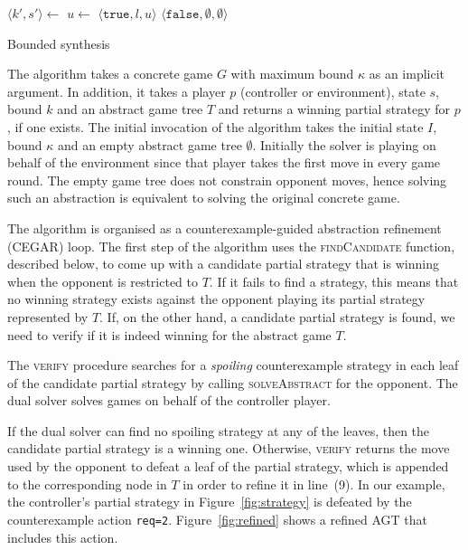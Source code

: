 \documentclass{llncs}
\newcommand{\True}{\texttt{true}}
\newcommand{\False}{\texttt{false}}
\begin{document}
\begin{algorithm}[t]
    \begin{algorithmic}
            \State $\langle k', s'\rangle \gets $  
                \State $u \gets $  
                 \Return $\langle \True, l, u \rangle$ \EndIIf {}
            \EndFor
            \State \Return $\langle \False, \emptyset, \emptyset \rangle$
        \EndFunction
    \end{algorithmic}

    \caption{Bounded synthesis}
    \label{alg:bounded}
\end{algorithm}

The algorithm takes a concrete game $G$ with maximum bound $\kappa$ as an implicit
argument.  In addition, it takes a player $p$ (controller or environment),
state $s$, bound $k$ and an abstract game tree $T$ and returns a winning
partial strategy for $p$, if one exists.  The initial invocation of the
algorithm takes the initial state $I$, bound $\kappa$ and an empty abstract
game tree $\emptyset$.  Initially the solver is playing on behalf of the
environment since that player takes the first move in every game round.  The
empty game tree does not constrain opponent moves, hence solving such an
abstraction is equivalent to solving the original concrete game.

The algorithm is organised as a counterexample-guided abstraction refinement
(CEGAR) loop.  The first step of the algorithm uses the \textsc{findCandidate}
function, described below, to come up with a candidate partial strategy that is
winning when the opponent is restricted to $T$.  If it fails to find a
strategy, this means that no winning strategy exists against the opponent
playing its partial strategy represented by $T$.  If, on the other hand, a
candidate partial strategy is found, we need to verify if it is indeed winning
for the abstract game $T$.

The \textsc{verify} procedure searches for a \emph{spoiling} counterexample
strategy in each leaf of the candidate partial strategy by calling
\textsc{solveAbstract} for the opponent. The dual solver solves games on behalf
of the controller player.  

If the dual solver can find no spoiling strategy at any of the leaves, then the
candidate partial strategy is a winning one. Otherwise, \textsc{verify} returns
the move used by the opponent to defeat a leaf of the partial strategy, which
is appended to the corresponding node in $T$ in order to refine it in line~(9).
In our example, the controller's partial strategy in Figure~\ref{fig:strategy}
is defeated by the counterexample action \texttt{req=2}.
Figure~\ref{fig:refined} shows a refined AGT that includes this action.
\end{document}
